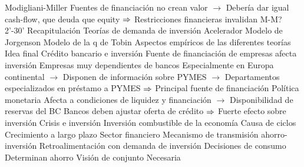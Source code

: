 \documentclass{nuevotema}
\begin{document}
\begin{esquemal}
				\4 Modigliani-Miller
				\4[] Fuentes de financiación no crean valor
				\4[] $\to$ Debería dar igual cash-flow, que deuda que equity
				\4[] $\Rightarrow$ Restricciones financieras invalidan M-M?
	\1[]  2'-30'
		\2 Recapitulación
			\3 Teorías de demanda de inversión
				\4 Acelerador
				\4 Modelo de Jorgenson
				\4 Modelo de la q de Tobin
			\3 Aspectos empíricos de las diferentes teorías
		\2 Idea final
			\3 Crédito bancario e inversión
				\4 Fuente de financiación de empresas afecta inversión
				\4 Empresas muy dependientes de bancos
				\4[] Especialmente en Europa continental
				\4[] $\to$ Disponen de información sobre PYMES
				\4[] $\to$ Departamentos especializados en préstamo a PYMES
				\4[] $\Rightarrow$ Principal fuente de financiación
				\4 Política monetaria
				\4[] Afecta a condiciones de liquidez y financiación
				\4[] $\to$ Disponibilidad de reservas del BC
				\4[] Bancos deben ajustar oferta de crédito
				\4[] $\Rightarrow$ Fuerte efecto sobre inversión
			\3 Crisis e inversión
				\4 Inversión combustible de la economía
				\4 Causa de ciclos
				\4 Crecimiento a largo plazo
			\3 Sector financiero
				\4 Mecanismo de transmisión ahorro-inversión
				\4 Retroalimentación con demanda de inversión
			\3 Decisiones de consumo
				\4 Determinan ahorro
			\3 Visión de conjunto
				\4 Necesaria
\end{esquemal}











































\graficas
\end{document}

